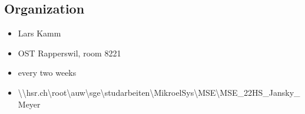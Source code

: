 \subsection{Organization}
\begin{itemize}
	\item {Lars Kamm}
	\item {OST Rapperswil, room 8221}
	\item {every two weeks}
	\item { \textbackslash \textbackslash hsr.ch\textbackslash root\textbackslash auw\textbackslash sge\textbackslash studarbeiten\textbackslash MikroelSys\textbackslash MSE\textbackslash MSE\_22HS\_Jansky\_Meyer}
\end{itemize}
\clearpage